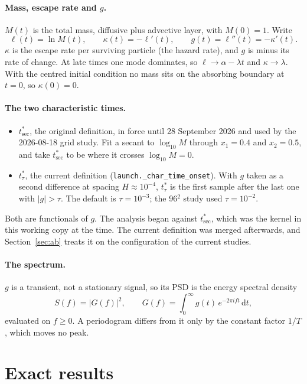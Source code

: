\documentclass[11pt]{article}
\newcommand{\tsec}{t^*_{\mathrm{sec}}}
\newcommand{\ttau}{t^*_{\tau}}
\newcommand{\dd}{\mathrm{d}}
\begin{document}
\paragraph{Mass, escape rate and $g$.}
$M(t)$ is the total mass, diffusive plus advective layer, with $M(0)=1$. Write
\[
  \ell(t)=\ln M(t),\qquad \kappa(t)=-\ell'(t),\qquad g(t)=\ell''(t)=-\kappa'(t).
\]
$\kappa$ is the escape rate per surviving particle (the hazard rate), and $g$ is
minus its rate of change. At late times one mode dominates, so
$\ell\to\alpha-\lambda t$ and $\kappa\to\lambda$. With the centred initial
condition no mass sits on the absorbing boundary at $t=0$, so $\kappa(0)=0$.

\paragraph{The two characteristic times.}
\begin{itemize}
\item $\tsec$, the original definition, in force until 28 September 2026 and used
  by the 2026-08-18 grid study. Fit a secant to $\log_{10}M$ through $x_1=0.4$ and
  $x_2=0.5$, and take $\tsec$ to be where it crosses $\log_{10}M=0$.
\item $\ttau$, the current definition (\texttt{launch.\_char\_time\_onset}). With
  $g$ taken as a second difference at spacing $H\approx10^{-4}$, $\ttau$ is the
  first sample after the last one with $|g|>\tau$. The default is $\tau=10^{-3}$;
  the 96$^2$ study used $\tau=10^{-2}$.
\end{itemize}
Both are functionals of $g$. The analysis began against $\tsec$, which was the
kernel in this working copy at the time. The current definition was merged
afterwards, and Section~\ref{sec:ab} treats it on the configuration of the current
studies.

\paragraph{The spectrum.}
$g$ is a transient, not a stationary signal, so its PSD is the energy spectral
density
\[
  S(f)=|G(f)|^2,\qquad G(f)=\int_0^\infty g(t)\,e^{-2\pi i f t}\,\dd t ,
\]
evaluated on $f\ge0$. A periodogram differs from it only by the constant factor
$1/T$, which moves no peak.

\section{Exact results}
\end{document}
